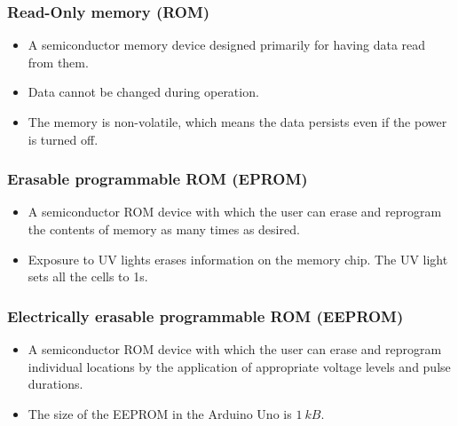 \documentclass[11pt]{article}
\begin{document}
\subsubsection{Read-Only memory (ROM)}
\label{sec:org5a1340f}
\begin{itemize}
\item A semiconductor memory device designed primarily for having data read from them.
\item Data cannot be changed during operation.
\item The memory is non-volatile, which means the data persists even if the power is turned off.
\end{itemize}
\subsubsection{Erasable programmable ROM (EPROM)}
\label{sec:orgd874686}
\begin{itemize}
\item A semiconductor ROM device with which the user can erase and reprogram the contents of memory as many times as desired.
\item Exposure to UV lights erases information on the memory chip. The UV light sets all the cells to 1s.
\end{itemize}
\subsubsection{Electrically erasable programmable ROM (EEPROM)}
\label{sec:org1df0a7e}
\begin{itemize}
\item A semiconductor ROM device with which the user can erase and reprogram individual locations by the application of appropriate voltage levels and pulse durations.
\item The size of the EEPROM in the Arduino Uno is \(\qty{1}{kB}\).
\end{itemize}

 \newpage
\end{document}
